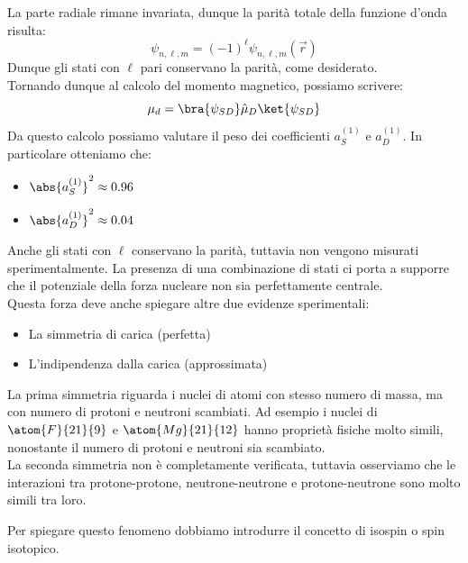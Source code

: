 La parte radiale rimane invariata, dunque la parità totale della funzione d'onda risulta:
\begin{equation}
 \psi_{n,\ell,m} = (-1)^\ell \psi_{n,\ell,m}(\vec{r})
\end{equation}
Dunque gli stati con $\ell$ pari conservano la parità, come desiderato.\\
Tornando dunque al calcolo del momento magnetico, possiamo scrivere:
\begin{equation}
  \mu_d = \bra{\psi_{SD}} \hat{\mu}_D \ket{\psi_{SD}}
 \end{equation}
Da questo calcolo possiamo valutare il peso dei coefficienti $a_S^{(1)}$ e $a_D^{(1)}$. In particolare otteniamo che:
\begin{itemize}
  \item $\abs{a_S^{(1)}}^2 \approx 0.96$
  \item $\abs{a_D^{(1)}}^2 \approx 0.04$
\end{itemize}
Anche gli stati con $\ell$ conservano la parità, tuttavia non vengono misurati sperimentalmente. La presenza di una combinazione di stati ci porta a supporre che il potenziale della forza nucleare non sia perfettamente centrale.\\
Questa forza deve anche spiegare altre due evidenze sperimentali:
\begin{itemize}
 \item La simmetria di carica (perfetta)
 \item L'indipendenza dalla carica (approssimata)
\end{itemize}
La prima simmetria riguarda i nuclei di atomi con stesso numero di massa, ma con numero di protoni e neutroni scambiati. Ad esempio i nuclei di $\atom{F}{21}{9}$ e $\atom{Mg}{21}{12}$ hanno proprietà fisiche molto simili, nonostante il numero di protoni e neutroni sia scambiato.\\
La seconda simmetria non è completamente verificata, tuttavia osserviamo che le interazioni tra protone-protone, neutrone-neutrone e protone-neutrone sono molto simili tra loro.


Per spiegare questo fenomeno dobbiamo introdurre il concetto di isospin o spin isotopico.\\
